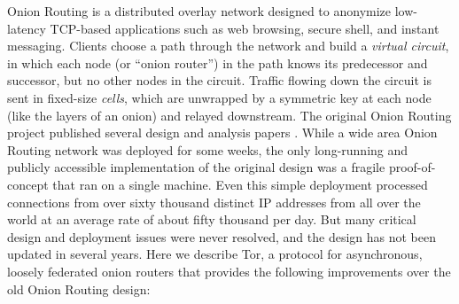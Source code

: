 \documentclass[times,10pt,twocolumn]{article}
\begin{document}
Onion Routing is a distributed overlay network designed to anonymize
low-latency TCP-based applications such as web browsing, secure shell,
and instant messaging. Clients choose a path through the network and
build a \emph{virtual circuit}, in which each node (or ``onion router'')
in the path knows its predecessor and successor, but no other nodes in
the circuit.  Traffic flowing down the circuit is sent in fixed-size
\emph{cells}, which are unwrapped by a symmetric key at each node
(like the layers of an onion) and relayed downstream. The original
Onion Routing project published several design and analysis papers
\cite{or-ih96,or-jsac98,or-discex00,or-pet00}. While a wide area Onion
Routing network was deployed for some weeks, the only long-running and
publicly accessible implementation of the original design was a fragile
proof-of-concept that ran on a single machine. Even this simple deployment
processed connections from over sixty thousand distinct IP addresses from
all over the world at an average rate of about fifty thousand per day.
But many critical design and deployment issues were never
resolved, and the design has not been updated in several years. Here
we describe Tor, a protocol for asynchronous, loosely federated onion
routers that provides the following improvements over the old Onion
Routing design:
\end{document}
